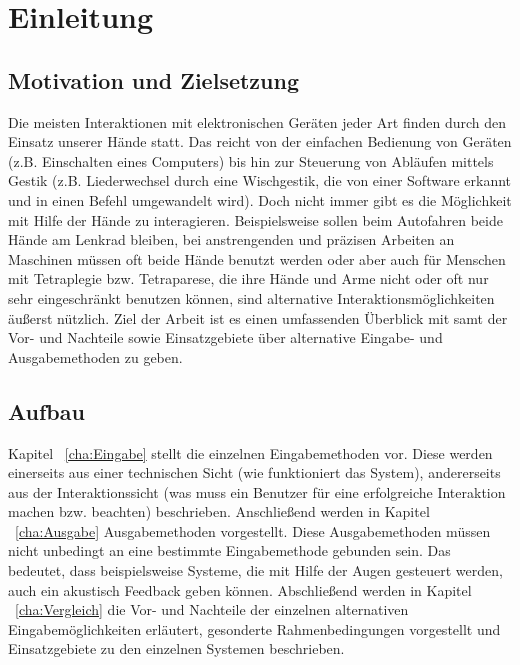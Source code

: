 \chapter{Einleitung}
\label{cha:Einleitung}

\section{Motivation und Zielsetzung}
%
Die meisten Interaktionen mit elektronischen Geräten jeder Art finden durch den Einsatz unserer Hände statt. Das reicht von der einfachen Bedienung von Geräten (z.B. Einschalten eines Computers) bis hin zur Steuerung von Abläufen mittels Gestik (z.B. Liederwechsel durch eine Wischgestik, die von einer Software erkannt und in einen Befehl umgewandelt wird). Doch nicht immer gibt es die Möglichkeit mit Hilfe der Hände zu interagieren. Beispielsweise sollen beim Autofahren beide Hände am Lenkrad bleiben, bei anstrengenden und präzisen Arbeiten an Maschinen müssen oft beide Hände benutzt werden oder aber auch für Menschen mit Tetraplegie bzw. Tetraparese, die ihre Hände und Arme nicht oder oft nur sehr eingeschränkt benutzen können, sind alternative Interaktionsmöglichkeiten äußerst nützlich.
\newline \newline
Ziel der Arbeit ist es einen umfassenden Überblick mit samt der Vor- und Nachteile sowie Einsatzgebiete über alternative Eingabe- und Ausgabemethoden zu geben.

\section{Aufbau}
Kapitel ~\ref{cha:Eingabe} stellt die einzelnen Eingabemethoden vor. Diese werden einerseits aus einer technischen Sicht (wie funktioniert das System), andererseits aus der Interaktionssicht (was muss ein Benutzer für eine erfolgreiche Interaktion machen bzw. beachten) beschrieben.
\newline \newline
Anschließend werden in Kapitel ~\ref{cha:Ausgabe} Ausgabemethoden vorgestellt. Diese Ausgabemethoden müssen nicht unbedingt an eine bestimmte Eingabemethode gebunden sein. Das bedeutet, dass beispielsweise Systeme, die mit Hilfe der Augen gesteuert werden, auch ein akustisch Feedback geben können. 
\newline \newline
Abschließend werden in Kapitel ~\ref{cha:Vergleich} die Vor- und Nachteile der einzelnen alternativen Eingabemöglichkeiten erläutert, gesonderte Rahmenbedingungen vorgestellt und Einsatzgebiete zu den einzelnen Systemen beschrieben.





